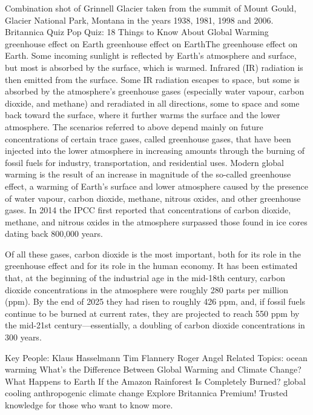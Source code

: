 Combination shot of Grinnell Glacier taken from the summit of Mount Gould, Glacier National Park, Montana in the years 1938, 1981, 1998 and 2006.
Britannica Quiz
Pop Quiz: 18 Things to Know About Global Warming
greenhouse effect on Earth
greenhouse effect on EarthThe greenhouse effect on Earth. Some incoming sunlight is reflected by Earth's atmosphere and surface, but most is absorbed by the surface, which is warmed. Infrared (IR) radiation is then emitted from the surface. Some IR radiation escapes to space, but some is absorbed by the atmosphere's greenhouse gases (especially water vapour, carbon dioxide, and methane) and reradiated in all directions, some to space and some back toward the surface, where it further warms the surface and the lower atmosphere.
The scenarios referred to above depend mainly on future concentrations of certain trace gases, called greenhouse gases, that have been injected into the lower atmosphere in increasing amounts through the burning of fossil fuels for industry, transportation, and residential uses. Modern global warming is the result of an increase in magnitude of the so-called greenhouse effect, a warming of Earth’s surface and lower atmosphere caused by the presence of water vapour, carbon dioxide, methane, nitrous oxides, and other greenhouse gases. In 2014 the IPCC first reported that concentrations of carbon dioxide, methane, and nitrous oxides in the atmosphere surpassed those found in ice cores dating back 800,000 years.

Of all these gases, carbon dioxide is the most important, both for its role in the greenhouse effect and for its role in the human economy. It has been estimated that, at the beginning of the industrial age in the mid-18th century, carbon dioxide concentrations in the atmosphere were roughly 280 parts per million (ppm). By the end of 2025 they had risen to roughly 426 ppm, and, if fossil fuels continue to be burned at current rates, they are projected to reach 550 ppm by the mid-21st century—essentially, a doubling of carbon dioxide concentrations in 300 years.

Key People: Klaus Hasselmann Tim Flannery Roger Angel
Related Topics: ocean warming What’s the Difference Between Global Warming and Climate Change? What Happens to Earth If the Amazon Rainforest Is Completely Burned? global cooling anthropogenic climate change
Explore Britannica Premium!
Trusted knowledge for those who want to know more.

